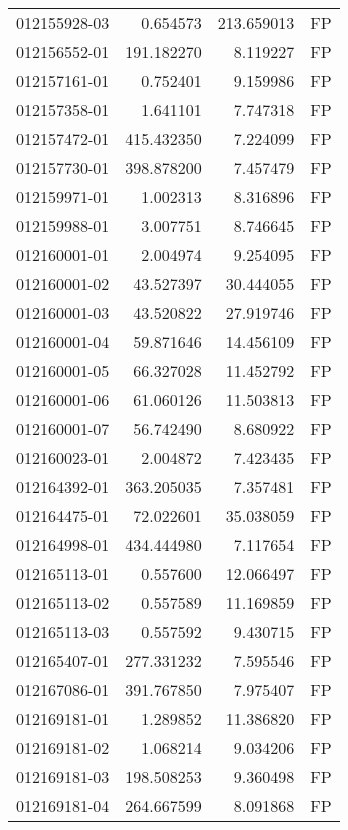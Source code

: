 \begin{tabular}{lrrl}
012155928-03 &    0.654573 &     213.659013 &   FP \\
012156552-01 &  191.182270 &       8.119227 &   FP \\
012157161-01 &    0.752401 &       9.159986 &   FP \\
012157358-01 &    1.641101 &       7.747318 &   FP \\
012157472-01 &  415.432350 &       7.224099 &   FP \\
012157730-01 &  398.878200 &       7.457479 &   FP \\
012159971-01 &    1.002313 &       8.316896 &   FP \\
012159988-01 &    3.007751 &       8.746645 &   FP \\
012160001-01 &    2.004974 &       9.254095 &   FP \\
012160001-02 &   43.527397 &      30.444055 &   FP \\
012160001-03 &   43.520822 &      27.919746 &   FP \\
012160001-04 &   59.871646 &      14.456109 &   FP \\
012160001-05 &   66.327028 &      11.452792 &   FP \\
012160001-06 &   61.060126 &      11.503813 &   FP \\
012160001-07 &   56.742490 &       8.680922 &   FP \\
012160023-01 &    2.004872 &       7.423435 &   FP \\
012164392-01 &  363.205035 &       7.357481 &   FP \\
012164475-01 &   72.022601 &      35.038059 &   FP \\
012164998-01 &  434.444980 &       7.117654 &   FP \\
012165113-01 &    0.557600 &      12.066497 &   FP \\
012165113-02 &    0.557589 &      11.169859 &   FP \\
012165113-03 &    0.557592 &       9.430715 &   FP \\
012165407-01 &  277.331232 &       7.595546 &   FP \\
012167086-01 &  391.767850 &       7.975407 &   FP \\
012169181-01 &    1.289852 &      11.386820 &   FP \\
012169181-02 &    1.068214 &       9.034206 &   FP \\
012169181-03 &  198.508253 &       9.360498 &   FP \\
012169181-04 &  264.667599 &       8.091868 &   FP \\

\end{tabular}
